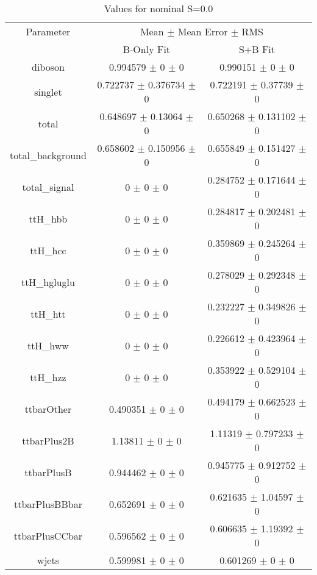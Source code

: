 \begin{table}
\centering
\caption{Values for nominal S=0.0}
\begin{tabular}{ccc}
\toprule
Parameter & \multicolumn{2}{c}{Mean $\pm$ Mean Error $\pm$ RMS}\\
 & B-Only Fit & S+B Fit\\
\midrule
diboson & \num{0.994579} $\pm$ \num{0} $\pm$ \num{0} & \num{0.990151} $\pm$ \num{0} $\pm$ \num{0}\\
singlet & \num{0.722737} $\pm$ \num{0.376734} $\pm$ \num{0} & \num{0.722191} $\pm$ \num{0.37739} $\pm$ \num{0}\\
total & \num{0.648697} $\pm$ \num{0.13064} $\pm$ \num{0} & \num{0.650268} $\pm$ \num{0.131102} $\pm$ \num{0}\\
total\_background & \num{0.658602} $\pm$ \num{0.150956} $\pm$ \num{0} & \num{0.655849} $\pm$ \num{0.151427} $\pm$ \num{0}\\
total\_signal & \num{0} $\pm$ \num{0} $\pm$ \num{0} & \num{0.284752} $\pm$ \num{0.171644} $\pm$ \num{0}\\
ttH\_hbb & \num{0} $\pm$ \num{0} $\pm$ \num{0} & \num{0.284817} $\pm$ \num{0.202481} $\pm$ \num{0}\\
ttH\_hcc & \num{0} $\pm$ \num{0} $\pm$ \num{0} & \num{0.359869} $\pm$ \num{0.245264} $\pm$ \num{0}\\
ttH\_hgluglu & \num{0} $\pm$ \num{0} $\pm$ \num{0} & \num{0.278029} $\pm$ \num{0.292348} $\pm$ \num{0}\\
ttH\_htt & \num{0} $\pm$ \num{0} $\pm$ \num{0} & \num{0.232227} $\pm$ \num{0.349826} $\pm$ \num{0}\\
ttH\_hww & \num{0} $\pm$ \num{0} $\pm$ \num{0} & \num{0.226612} $\pm$ \num{0.423964} $\pm$ \num{0}\\
ttH\_hzz & \num{0} $\pm$ \num{0} $\pm$ \num{0} & \num{0.353922} $\pm$ \num{0.529104} $\pm$ \num{0}\\
ttbarOther & \num{0.490351} $\pm$ \num{0} $\pm$ \num{0} & \num{0.494179} $\pm$ \num{0.662523} $\pm$ \num{0}\\
ttbarPlus2B & \num{1.13811} $\pm$ \num{0} $\pm$ \num{0} & \num{1.11319} $\pm$ \num{0.797233} $\pm$ \num{0}\\
ttbarPlusB & \num{0.944462} $\pm$ \num{0} $\pm$ \num{0} & \num{0.945775} $\pm$ \num{0.912752} $\pm$ \num{0}\\
ttbarPlusBBbar & \num{0.652691} $\pm$ \num{0} $\pm$ \num{0} & \num{0.621635} $\pm$ \num{1.04597} $\pm$ \num{0}\\
ttbarPlusCCbar & \num{0.596562} $\pm$ \num{0} $\pm$ \num{0} & \num{0.606635} $\pm$ \num{1.19392} $\pm$ \num{0}\\
wjets & \num{0.599981} $\pm$ \num{0} $\pm$ \num{0} & \num{0.601269} $\pm$ \num{0} $\pm$ \num{0}\\
\bottomrule
\end{tabular}
\end{table}
